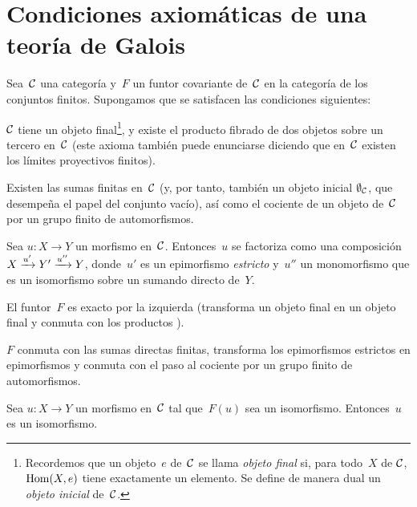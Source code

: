 
\section{Condiciones axiomáticas de una teoría de Galois}
\label{V.4}
Sea~$\cal{C}$ una categoría y~$F$ un funtor covariante de~$\cal{C}$ en la
categoría de los conjuntos finitos. Supongamos que se satisfacen las
condiciones siguientes:

\begin{enumerateb}

\item[(G 1)] $\cal{C}$ tiene un objeto final\footnote{Recordemos que un
objeto~$e$ de~$\cal{C}$ se llama \emph{objeto final} si, para todo~$X$ de
$\cal{C}$, $\Hom(X,e)$ tiene exactamente un elemento. Se define de manera
dual un \emph{objeto inicial} de~$\cal{C}$.}, y existe el producto fibrado de
dos objetos sobre un tercero en~$\cal{C}$ (este axioma también puede
enunciarse diciendo que en~$\cal{C}$ existen los límites proyectivos
finitos).

\item[(G 2)] Existen las sumas finitas en~$\cal{C}$ (y, por tanto, también
un objeto inicial $\emptyset_{\cal{C}}$, que desempeña el papel del conjunto
vacío), así como el cociente de un objeto de~$\cal{C}$ por un grupo finito
de automorfismos.

\item[(G 3)] Sea $u\colon X\to Y$ un morfismo en~$\cal{C}$. Entonces~$u$ se
factoriza como una composición $X\lto{u'}Y'\lto{u''}Y$, donde~$u'$ es un
epimorfismo \emph{estricto} y~$u''$ un monomorfismo que es un isomorfismo
sobre un sumando directo de~$Y$.

\item[(G 4)]
El funtor~$F$ es exacto por la izquierda (\ie transforma un objeto final en
un objeto final y conmuta con los productos
).%

\item[(G 5)] $F$ conmuta con las sumas directas finitas, transforma los
epimorfismos estrictos en epimorfismos y conmuta con el paso al cociente por
un grupo finito de automorfismos.

\item[(G 6)] Sea $u\colon X\to Y$ un morfismo en~$\cal{C}$ tal que~$F(u)$
sea un isomorfismo. Entonces~$u$ es un isomorfismo.
\end{enumerateb}

